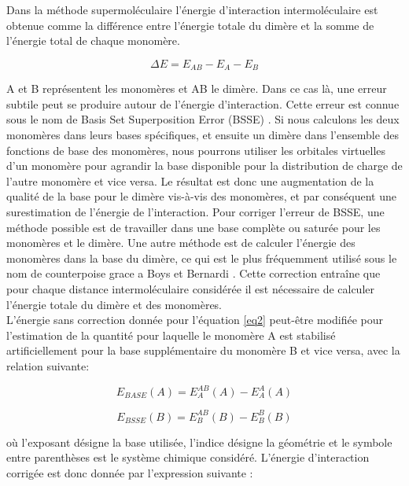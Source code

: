 Dans la méthode supermoléculaire l’énergie d’interaction intermoléculaire est obtenue comme la différence entre l’énergie totale du dimère et la somme de l’énergie total de chaque monomère.

\begin{equation}
\Delta E = E_{AB} - E_{A} - E_{B} \label{eq2}
\end{equation}

A et B représentent les monomères et AB le dimère. Dans ce cas là, une erreur subtile peut se produire autour de l’énergie d’interaction. Cette erreur est connue sous le nom de Basis Set Superposition Error (BSSE) \cite{sherrill2010counterpoise}. Si nous calculons les deux monomères dans leurs bases spécifiques, et ensuite un dimère dans l’ensemble des fonctions de base des monomères, nous pourrons utiliser les orbitales virtuelles d’un monomère pour agrandir la base disponible pour la distribution de charge de l’autre monomère et vice versa. Le résultat est donc une augmentation de la qualité de la base pour le dimère vis-à-vis des monomères, et par conséquent une surestimation de l’énergie de l’interaction. Pour corriger l’erreur de BSSE, une méthode possible est de travailler dans une base complète ou saturée pour les monomères et le dimère. Une autre méthode est de calculer l’énergie des monomères dans la base du dimère, ce qui est le plus fréquemment utilisé sous le nom de counterpoise grace a Boys et Bernardi \cite{boys1970calculation}. Cette correction entraîne que pour chaque distance intermoléculaire considérée il est nécessaire de calculer l’énergie totale du dimère et des monomères.\\

L’énergie sans correction donnée pour l’équation \ref{eq2}  peut-être modifiée pour l'estimation de la quantité pour laquelle le monomère A est stabilisé artificiellement pour la base supplémentaire du monomère B et vice versa, avec la relation suivante:

\begin{equation}
E_{BASE}(A) = E_{A}^{AB}(A) - E_{A}^{A}(A)
\end{equation}

\begin{equation}
E_{BSSE}(B) = E_{B}^{AB}(B) - E_{B}^{B}(B)
\end{equation}

où l'exposant désigne la base utilisée, l'indice désigne la géométrie et le symbole entre parenthèses est le système chimique considéré.
L'énergie d'interaction corrigée est donc donnée par l'expression suivante :

